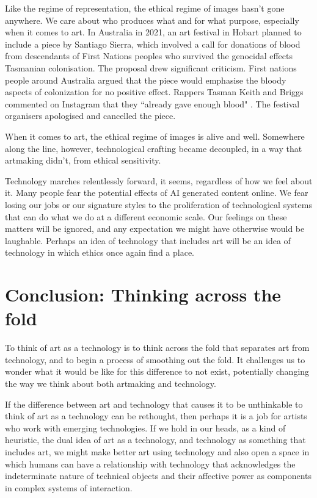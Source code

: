 \documentclass[letter:wpaper]{article}
\begin{document}
    Like the regime of representation, the ethical regime of images hasn't gone anywhere. We care about who produces what and for what purpose, especially when it comes to art. In Australia in 2021, an art festival in Hobart planned to include a piece by Santiago Sierra, which involved a call for donations of blood from descendants of First Nations peoples who survived the genocidal effects Tasmanian colonisation. The proposal drew significant criticism. First nations people around Australia argued that the piece would emphasise the bloody aspects of colonization for no positive effect. Rappers Tasman Keith and Briggs commented on Instagram that they ``already gave enough blood" \citep{DrkMfBld2021}. The festival organisers apologised and cancelled the piece.
    
    When it comes to art, the ethical regime of images is alive and well. Somewhere along the line, however, technological crafting became decoupled, in a way that artmaking didn't, from ethical sensitivity.
    
    Technology marches relentlessly forward, it seems, regardless of how we feel about it. Many people fear the potential effects of AI generated content online. We fear losing our jobs or our signature styles to the proliferation of technological systems that can do what we do at a different economic scale. Our feelings on these matters will be ignored, and any expectation we might have otherwise would be laughable. Perhaps an idea of technology that includes art will be an idea of technology in which ethics once again find a place.
    
\section{Conclusion: Thinking across the fold}

   To think of art as a technology is to think across the fold that separates art from technology, and to begin a process of smoothing out the fold. It challenges us to wonder what it would be like for this difference to not exist, potentially changing the way we think about both artmaking and technology.
    
    If the difference between art and technology that causes it to be unthinkable to think of art as a technology can be rethought, then perhaps it is a job for artists who work with emerging technologies. If we hold in our heads, as a kind of heuristic, the dual idea of art as a technology, and technology as something that includes art, we might make better art using technology and also open a space in which humans can have a relationship with technology that acknowledges the indeterminate nature of technical objects and their affective power as components in complex systems of interaction.
    
\end{document}

